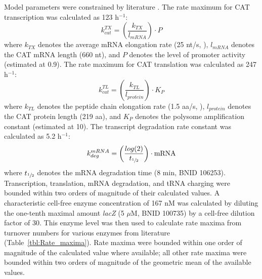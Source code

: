 \documentclass[12pt]{article}
\begin{document}
Model parameters were constrained by literature \cite{Milo:2009aa}.
The rate maximum for CAT transcription was calculated as 123 h$^{-1}$:
\begin{equation}\label{eqn:transcription}
	k_{cat}^{TX}=\left(\frac{k_{TX}}{l_{mRNA}}\right)\cdot P
\end{equation}
where $k_{TX}$ denotes the average mRNA elongation rate (25 nt/s, \cite{Garamella:2016aa}), $l_{mRNA}$ denotes the CAT mRNA length (660 nt), and $P$ denotes the level of promoter activity (estimated at 0.9).
The rate maximum for CAT translation was calculated as 247 h$^{-1}$:
\begin{equation}\label{eqn:transcription}
	k_{cat}^{TL}=\left(\frac{k_{TL}}{l_{protein}}\right)\cdot K_P
\end{equation}
where $k_{TL}$ denotes the peptide chain elongation rate (1.5 aa/s, \cite{Garamella:2016aa}), $l_{protein}$ denotes the CAT protein length (219 aa), and $K_P$ denotes the polysome amplification constant (estimated at 10).
The transcript degradation rate constant was calculated as 5.2 h$^{-1}$:
\begin{equation}\label{eqn:transcription}
	k_{deg}^{mRNA}=\left(\frac{log(2)}{t_{\sfrac{1}{2}}}\right)\cdot{\rm mRNA}
\end{equation}
where $t_{\sfrac{1}{2}}$ denotes the mRNA degradation time (8 min, BNID 106253).
Transcription, translation, mRNA degradation, and tRNA charging were bounded within two orders of magnitude of their calculated values.
A characteristic cell-free enzyme concentration of 167 nM was calculated by diluting the one-tenth maximal amount \textit{lacZ} (5 $\mu$M, BNID 100735) by a cell-free dilution factor of 30.
This enzyme level was then used to calculate rate maxima from turnover numbers for various enzymes from literature (Table~\ref{tbl:Rate_maxima}).
Rate maxima were bounded within one order of magnitude of the calculated value where available; all other rate maxima were bounded within two orders of magnitude of the geometric mean of the available values.
\end{document}
